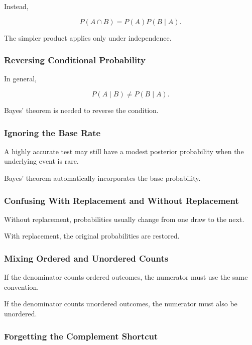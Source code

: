 Instead,

\[
P(A\cap B)
=
P(A)P(B\mid A).
\]

The simpler product applies only under independence.

\subsubsection{Reversing Conditional Probability}

In general,

\[
\boxed{
P(A\mid B)
\neq
P(B\mid A).
}
\]

Bayes' theorem is needed to reverse the condition.

\subsubsection{Ignoring the Base Rate}

A highly accurate test may still have a modest posterior probability
when the underlying event is rare.

Bayes' theorem automatically incorporates the base probability.

\subsubsection{Confusing With Replacement and Without Replacement}

Without replacement, probabilities usually change from one draw to the
next.

With replacement, the original probabilities are restored.

\subsubsection{Mixing Ordered and Unordered Counts}

If the denominator counts ordered outcomes, the numerator must use the
same convention.

If the denominator counts unordered outcomes, the numerator must also
be unordered.

\subsubsection{Forgetting the Complement Shortcut}

